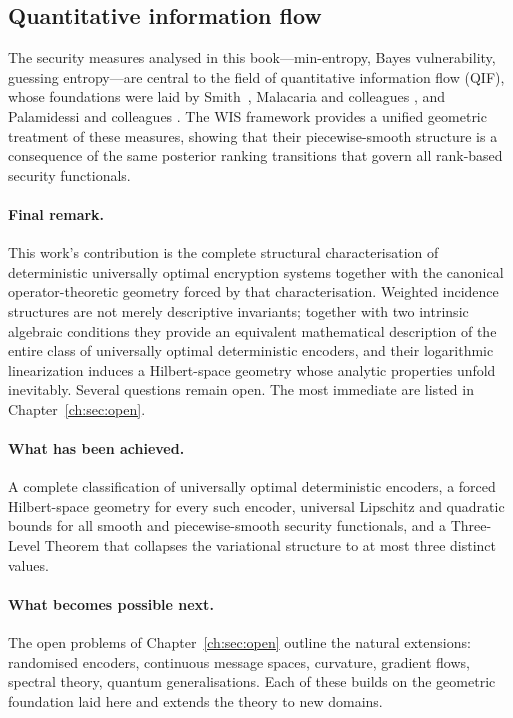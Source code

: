 \subsection*{Quantitative information flow}\label{ch:sec:quantitative-information-flow}
The security measures analysed in this book---min-entropy, Bayes
vulnerability, guessing entropy---are central to the field of
quantitative information flow (QIF), whose foundations were laid
by Smith~\cite{smith2009foundations}, Malacaria and colleagues
\cite{malacaria2007assessing, clark2007static}, and Palamidessi and
colleagues \cite{chatzikokolakis2005probability, alvim2012information,
alvim2023information}.  The WIS framework provides a unified geometric
treatment of these measures, showing that their piecewise-smooth
structure is a consequence of the same posterior ranking transitions
that govern all rank-based security functionals.
\paragraph{Final remark.}  This work's contribution is the complete
structural characterisation of deterministic universally optimal
encryption systems together with the canonical operator-theoretic
geometry forced by that characterisation.  Weighted incidence
structures are not merely descriptive invariants; together with two
intrinsic algebraic conditions they provide an equivalent mathematical
description of the entire class of universally optimal deterministic
encoders, and their logarithmic linearization induces a Hilbert-space
geometry whose analytic properties unfold inevitably.
Several questions remain open.  The most immediate are listed in
Chapter~\ref{ch:sec:open}.

\paragraph{What has been achieved.}
A complete classification of universally optimal deterministic encoders, a forced Hilbert-space geometry for every such encoder, universal Lipschitz and quadratic bounds for all smooth and piecewise-smooth security functionals, and a Three-Level Theorem that collapses the variational structure to at most three distinct values.

\paragraph{What becomes possible next.}
The open problems of Chapter~\ref{ch:sec:open} outline the natural extensions: randomised encoders, continuous message spaces, curvature, gradient flows, spectral theory, quantum generalisations.  Each of these builds on the geometric foundation laid here and extends the theory to new domains.

\endinput
